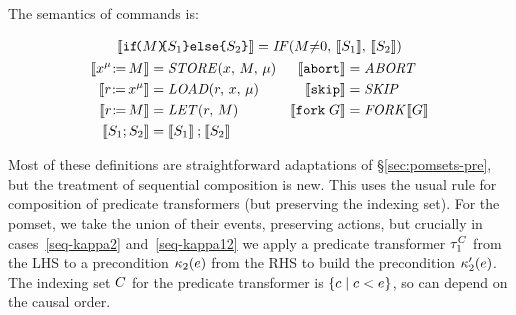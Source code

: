 \begin{definition}
  \noindent
  The semantics of commands is:
  \begin{scope}
    \allowdisplaybreaks
    \begin{gather*}
      \sem{\IF{\aExp}\THEN\aCmd_1\ELSE\aCmd_2\FI} = \sIF{\aExp{\neq}0}\sTHEN\sem{\aCmd_1}\sELSE\sem{\aCmd_2}\sFI
      \\
      \begin{aligned}
        \sem{\PW[\amode]{\aLoc}{\aExp}} &= \sSTORE[\amode]{\aLoc}{\aExp}
        &
        \makebox[0em][r]{$\sem{\ABORT}$} &= \sABORT 
        \\
        \sem{\PR[\amode]{\aLoc}{\aReg}} &= \sLOAD[\amode]{\aReg}{\aLoc}
        &
        \sem{\SKIP} &= \sSKIP 
        \\
        \sem{\LET{\aReg}{\aExp}} &= \sLET{\aReg}{\aExp}
        &
        \sem{\FORK{\aGrp}} &= \sFORK{}\sem{\aGrp}      
        \\
        \sem{\aCmd_1 \SEMI \aCmd_2} &= \sem{\aCmd_1}\sSEMI\sem{\aCmd_2}
      \end{aligned}
    \end{gather*}
  \end{scope}
\end{definition}

Most of these definitions are straightforward adaptations of
\S\ref{sec:pomsets-pre}, but the treatment of sequential composition
is new.  This uses the usual rule for composition of predicate
transformers (but preserving the indexing set). For the pomset, we
take the union of their events, preserving actions, but crucially in
cases~\ref{seq-kappa2} and~\ref{seq-kappa12} we apply a predicate
transformer $\aTr[1]{\cEvs}{}$ from the LHS to a precondition
$\kappa_2(e)$ from the RHS to build the precondition
$\kappa'_2(e)$.  The indexing set $C$ for the predicate
transformer is $\{ c\mid c<e \}$, so can depend on the causal
order.



